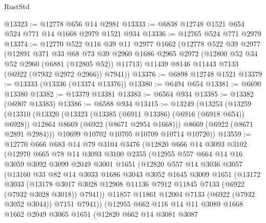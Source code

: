 \begin{lexlean}{RustStd}
\begin{coremodule}
@13323 := @12778 @656 @14 @2981
@13333 := @6838 @12748 @1521 @654 @524 @771 @14 @1668 @2979 @1521 @934
@13336 := @12765 @524 @771 @2979
@13374 := @12770
    @522
    @116
    @39
    @11
    @2977
    @1662
    (@12778
      @522
      @39
      @2977
      (@12891
        @371
        @33
        @68
        @73
        @39
        @2960
        @1686
        @2965
        @2972
        (@12800 @52 @34 @52 @2960 (@6881 (@12805 @52)) @11713)
        @11439
        @8146
        @11443
        @7133
        (@6922 (@7932 @2972 @2966))
        @7941))
@13376 := @6898 @12748 @1521
@13379 := @13333 (@13336 (@13374 @13376))
@13380 := @6494 @654
@13381 := @6690 @13380
@13382 := @13379 @13381
@13383 := @6564 @934
@13385 := @13382 (@6907 @13383)
@13386 := @6588 @934
@13415 := @13249
    (@13253
      (@13259
        (@13310
          (@13320
            (@13323 (@13385 (@6911 @13386) (@6916 (@6918 @654)) @6928))
            @12864
            @8669
            (@6922 (@8671 @2954 @1668)))
          @8669
          (@6922 (@8671 @2891 @2984)))
        @10699
        @10702
        @10705
        @10709
        @10714
        @10720))
@13559 := @12770
    @666
    @683
    @14
    @79
    @3104
    @3476
    (@12820
      @666
      @14
      @3093
      @3102
      (@12970
        @665
        @78
        @14
        @3093
        @3100
        @2355
        (@12955
          @557
          @664
          @14
          @16
          @3059
          @3092
          @3099
          @2049
          @3001
          @1651
          (@12820
            @557
            @14
            @3036
            @3057
            (@13160
              @33
              @82
              @14
              @3033
              @1686
              @3043
              @3052
              @1645
              @3009
              @1651
              (@13172
                @3033
                (@13178
                  @3017
                  @3028
                  @12908
                  @11136
                  @7912
                  @11845
                  @7133
                  (@6922 (@7932 @3028 @3018))
                  @7941))
              @11857
              @11861
              @12004
              @7133
              (@6922 (@7932 @3052 @3044))
              @7151
              @7941))
          (@12955
            @662
            @116
            @14
            @11
            @3089
            @1668
            @1662
            @2049
            @3065
            @1651
            (@12820
              @662
              @14
              @3081
              @3087

\end{coremodule}
\end{lexlean}
